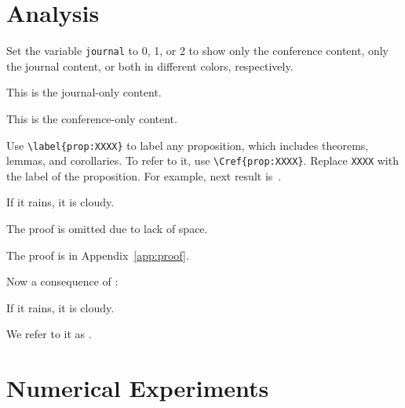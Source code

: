\documentclass{article}
\begin{document}
\section{Analysis}

\begin{bullets}
    \blt[overview]
    \blt[journal]  Set the variable \texttt{journal} to 0, 1, or 2 to show only the conference content, only the journal content, or both in different colors, respectively.
    \begin{journalonly}
        This is the journal-only content.
    \end{journalonly}
    \begin{conferenceonly}
        This is the conference-only content.
    \end{conferenceonly}

    \blt[References]Use \texttt{\textbackslash label\{prop:XXXX\}} to label any proposition, which includes theorems, lemmas, and corollaries. To refer to it, use \texttt{\textbackslash Cref\{prop:XXXX\}}. Replace \texttt{XXXX} with the label of the proposition.  For example, next result is~.


    \begin{theorem}
        \label{prop:mainresult}
        If it rains, it is cloudy.
    \end{theorem}
    \begin{IEEEproof}
        \begin{conferenceonly}
            The proof is omitted due to lack of space.
        \end{conferenceonly}
        \begin{journalonly}
            The proof is in Appendix~\ref{app:proof}.
        \end{journalonly}
    \end{IEEEproof}

    \blt[corollary] Now a consequence of :

    \begin{corollary}
        \label{prop:corollary}
        If it rains, it is cloudy.
    \end{corollary}

    We refer to it as .



\end{bullets}


\section{Numerical Experiments}
\end{document}
